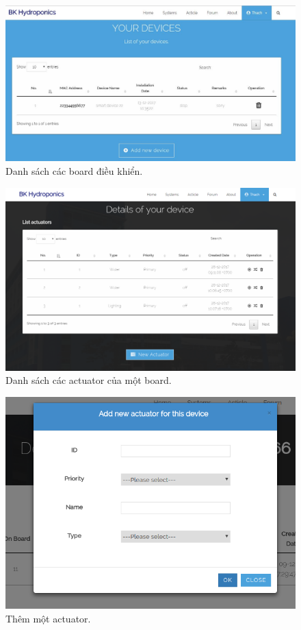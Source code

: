 \documentclass[a4paper,12pt,oneside]{article}
\begin{document}
\begin{center}
\begin{figure}[H]
\centering
\includegraphics[scale=.52]{hinh/web_devices.jpg}
\caption{Danh sách các board điều khiển.}
\end{figure}

\begin{figure}[H]
\centering
\includegraphics[scale=.45]{hinh/web_actuator_list.png}
\caption{Danh sách các actuator của một board.}
\end{figure}

\begin{figure}[H]
\centering
\includegraphics[scale=.5]{hinh/web_add_actuator.png}
\caption{Thêm một actuator.}
\end{figure}


\end{center}
\end{document}
